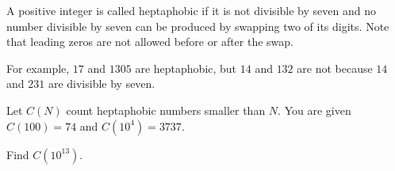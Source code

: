 A positive integer is called heptaphobic if it is not divisible by seven and no number divisible by seven can be produced by swapping two of its digits. Note that leading zeros are not allowed before or after the swap.

For example, $17$ and $1305$ are heptaphobic, but $14$ and $132$ are not because $14$ and $231$ are divisible by seven.

Let $C(N)$ count heptaphobic numbers smaller than $N$. You are given $C(100) = 74$ and $C(10^4) = 3737$.

Find $C(10^{13})$.


